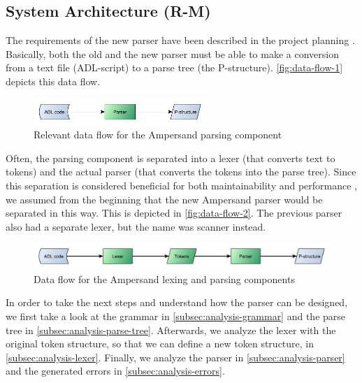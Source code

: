 
\subsection{System Architecture (R-M)}
The requirements of the new parser have been described in the project planning .
Basically, both the old and the new parser must be able to make a conversion from a text file (ADL-script) to a parse tree (the P-structure).
\autoref{fig:data-flow-1} depicts this data flow.
%
\begin{figure}[htb!]
	\centering
	\includegraphics[width=0.586\textwidth]{Figures/DataFlow1}
	\caption{Relevant data flow for the Ampersand parsing component}
	\label{fig:data-flow-1}
\end{figure}

Often, the parsing component is separated into a lexer (that converts text to tokens) and the actual parser (that converts the tokens into the parse tree).
Since this separation is considered beneficial for both maintainability and performance , we assumed from the beginning that the new Ampersand parser would be separated in this way.
This is depicted in \autoref{fig:data-flow-2}.
The previous parser also had a separate lexer, but the name was scanner instead.
%
\begin{figure}[htb!]
	\centering
	\includegraphics[width=1\textwidth]{Figures/DataFlow2}
	\caption{Data flow for the Ampersand lexing and parsing components}
	\label{fig:data-flow-2}
\end{figure}

In order to take the next steps and understand how the parser can be designed, we first take a look at the grammar in \autoref{subsec:analysis-grammar} and the parse tree in \autoref{subsec:analysis-parse-tree}.
Afterwards, we analyze the lexer with the original token structure, so that we can define a new token structure, in \autoref{subsec:analysis-lexer}.
Finally, we analyze the parser in \autoref{subsec:analysis-parser} and the generated errors in \autoref{subsec:analysis-errors}.
